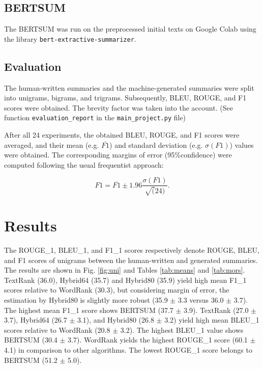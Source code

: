 \documentclass[11pt]{article}
\begin{document}
\subsection{BERTSUM}

The BERTSUM was run on the preprocessed initial texts on Google Colab using the library \texttt{bert-extractive-summarizer}.

\subsection{Evaluation}

The human-written summaries and the machine-generated summaries were split into unigrams, bigrams, and trigrams. Subsequently, BLEU, ROUGE, and F1 scores were obtained. The brevity factor was taken into the account. (See function \texttt{evaluation\_report} in the \texttt{main\_project.py} file)

After all 24 experiments, the obtained BLEU, ROUGE, and F1 scores were averaged, and their mean (e.g. $\overline{F1}$) and standard deviation (e.g. $\sigma(F1)$) values were obtained. The corresponding margins of error (95\%confidence) were computed following the usual frequentist approach:

\begin{equation}
 F1 = \overline{F1} \pm 1.96 \frac{\sigma(F1)}{\sqrt(24)}.
\end{equation}


\section{Results}

The ROUGE\_1, BLEU\_1, and F1\_1 scores respectively denote ROUGE, BLEU, and F1 scores of unigrams between the human-written and generated summaries. The results are shown in Fig. \ref{fig:uni} and Tables \ref{tab:means} and \ref{tab:mors}. TextRank (36.0), Hybrid64 (35.7) and Hybrid80 (35.9) yield high mean F1\_1 scores relative to WordRank (30.3), but considering margin of error, the estimation by Hybrid80 is slightly more robust (35.9 $\pm$ 3.3 versus 36.0 $\pm$ 3.7). The highest mean F1\_1 score shows BERTSUM (37.7 $\pm$ 3.9). TextRank (27.0 $\pm$ 3.7), Hybrid64 (26.7 $\pm$ 3.1), and Hybrid80 (26.8 $\pm$ 3.2) yield high mean BLEU\_1 scores relative to WordRank (20.8 $\pm$ 3.2). The highest BLEU\_1 value shows BERTSUM (30.4 $\pm$ 3.7). WordRank yields the highest ROUGE\_1 score (60.1 $\pm$ 4.1) in comparison to other algorithms. The lowest ROUGE\_1 score belongs to BERTSUM (51.2 $\pm$ 5.0).
\end{document}
